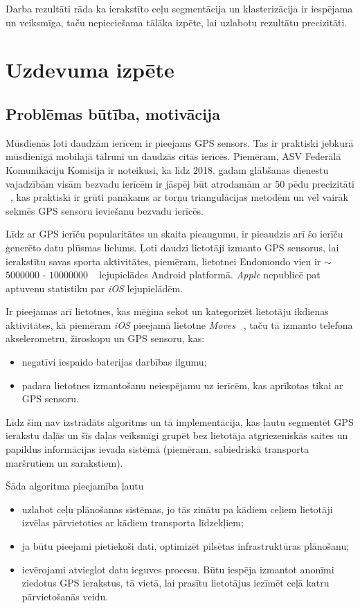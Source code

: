 \documentclass{ludis}
\begin{document}

Darba rezultāti rāda ka ierakstīto ceļu segmentācija un klasterizācija ir iespējama un veiksmīga,
taču nepieciešama tālāka izpēte, lai uzlabotu rezultātu precizitāti.

\chapter{Uzdevuma izpēte}
\section{Problēmas būtība, motivācija}
Mūsdienās ļoti daudzām ierīcēm ir pieejams GPS sensors. Tas ir praktiski jebkurā mūsdienīgā mobilajā
tālrunī un daudzās citās ierīcēs. Piemēram, ASV Federālā Komunikāciju Komisija ir noteikusi, ka līdz
2018. gadam glāb\-šanas dienestu vajadzībām visām bezvadu ierīcēm ir jāspēj būt atrodamām 
ar $50$ pēdu precizitāti ~\cite{fcc_e911}, kas praktiski ir grūti panākams ar torņu trian\-gulācijas 
metodēm un vēl vairāk sekmēs GPS sensoru ieviešanu bezvadu ierīcēs.

Līdz ar GPS ierīču popularitātes un skaita pieaugumu, ir pieaudzis arī šo ierīču ģenerēto datu
plūsmas lielums. Ļoti daudzi lietotāji izmanto GPS sensorus, lai ierakstītu savas sporta aktivitātes,
piemēram, lietotnei Endo\-mondo vien ir $\sim$ $5000000$ - $10000000$ ~\cite{g_play_endomondo} 
lejupielādes Android platformā. \emph{Apple} nepublicē pat aptuvenu statistiku par \emph{iOS}
lejupielādēm.

Ir pieejamas arī lietotnes, kas mēģina sekot un kategorizēt lietotāju \linebreak ikdienas 
aktivitātes, kā piemēram \emph{iOS} pieejamā lietotne \emph{Moves} ~\cite{moves_app}, taču tā 
izmanto telefona akselerometru, žiroskopu un GPS sensoru, kas:
\begin{itemize}
\item negatīvi iespaido baterijas darbības ilgumu;
\item padara lietotnes izmantošanu neiespējamu uz ierīcēm, kas aprīkotas tikai ar GPS sensoru.
\end{itemize}

Līdz šim nav izstrādāts algoritms un tā implementācija, kas ļautu seg\-mentēt GPS ierakstu daļās un 
šīs daļas veiksmīgi grupēt bez lietotāja atgrie\-zeniskās saites un papildus informācijas ievada
sistēmā (piemēram, sabiedriskā transporta maršrutiem un sarakstiem).

Šāda algoritma pieejamība ļautu 
\begin{itemize}
\item uzlabot ceļu plānošanas sistēmas, jo tās zinātu pa kādiem ceļiem lieto\-tāji izvēlas
  pārvietoties ar kādiem transporta līdzekļiem;
\item ja būtu pieejami pietiekoši dati, optimizēt pilsētas infrastruktūras \linebreak plānošanu;
\item ievērojami atvieglot datu ieguves procesu. Būtu iespēja izmantot ano\-nīmi ziedotus GPS 
  ierakstus, tā vietā, lai prasītu lietotājus iezīmēt ceļā katru pārvietošanās veidu.
\end{itemize}
\end{document}
